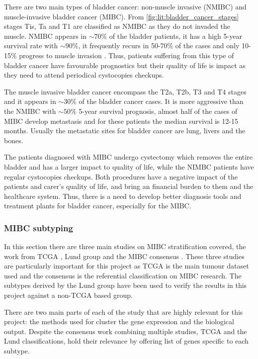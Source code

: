 There are two main types of bladder cancer: non-muscle invasive (NMIBC) and muscle-invasive bladder cancer (MIBC). From \cref{fig:lit:bladder_cancer_stages} stages Tis, Ta and T1 are classified as NMIBC as they do not invaded the muscle. NMIBC appears in $\sim70\%$ of the bladder patients, it has a high 5-year survival rate with $\sim90\%$, it frequently recurs in 50-70\% of the cases and only 10-15\% progress to muscle invasion \cite{Knowles2015-mu}. Thus, patients suffering from this type of bladder cancer have favourable prognostics but their quality of life is impact as they need to attend periodical cystocopies checkups.

The muscle invasive bladder cancer encompass the T2a, T2b, T3 and T4 stages and it appears in $\sim30\%$ of the bladder cancer cases. It is more aggressive than the NMIBC with $\sim50\%$ 5-year survival prognosis, almost half of the cases of MIBC develop metastasis and for these patients the median survival is 12-15 months\cite{Knowles2015-mu}. Usually the metastatic sites for bladder cancer are lung, livers and the bones.

The patients diagnosed with MIBC undergo cystectomy which removes the entire bladder and has a larger impact to quality of life, while the NIMBC patients have regular cystocopies checkups. Both procedures have a negative impact of the patients and carer's quality of life, and bring an financial burden to them and the healthcare system. Thus, there is a need to develop better diagnosis tools and treatment plants for bladder cancer, especially for the MIBC.

\subsubsection{MIBC subtyping} \label{s:lit:subtypes_mibc}

In this section there are three main studies on MIBC stratification covered, the work from TCGA \citet{Robertson2017-mg}, Lund group \cite{Marzouka2018-ge} and the MIBC consensus \cite{Kamoun2020-tj}. These three studies are particularly important for this project as TCGA is the main tumour dataset used and the consensus is the referential classification on MIBC research. The subtypes derived by the Lund group have been used to verify the results in this project against a non-TCGA based group.

There are two main parts of each of the study that are highly relevant for this project: the methods used for cluster the gene expression and the biological output. Despite the consensus work combining multiple studies, TCGA and the Lund classifications, hold their relevance by offering list of genes specific to each subtype. 

